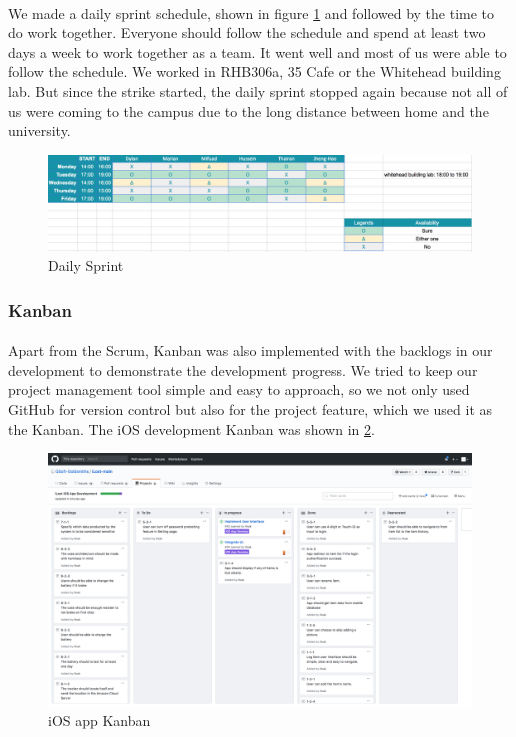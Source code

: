 \documentclass[12pt,a4paper]{article}
\begin{document}
          \paragraph{}We made a daily sprint schedule, shown in figure \ref{fig:Daily Sprint} and followed by the time to do work together. Everyone should follow the schedule and spend at least two days a week to work together as a team. It went well and most of us were able to follow the schedule. We worked in RHB306a, 35 Cafe or the Whitehead building lab. But since the strike started, the daily sprint stopped again because not all of us were coming to the campus due to the long distance between home and the university. 

          \begin{figure}[H]
            \centering
            \includegraphics[width=1\textwidth]{../assets/development-records-daily-sprint.png}
            \caption{Daily Sprint}
            \label{fig:Daily Sprint}
          \end{figure}

        \subsubsection{Kanban}
          \paragraph{}Apart from the Scrum, Kanban was also implemented with the backlogs in our development to demonstrate the development progress. We tried to keep our project management tool simple and easy to approach, so we not only used GitHub for version control but also for the project feature, which we used it as the Kanban. The iOS  development Kanban was shown in \ref{fig:iOS Development Kanban}.

          \begin{figure}[H]
            \centering
            \includegraphics[width=1\textwidth]{../assets/development-records-ios-kanban.png}
            \caption{iOS app Kanban}
            \label{fig:iOS Development Kanban}
          \end{figure}
         
\end{document}
